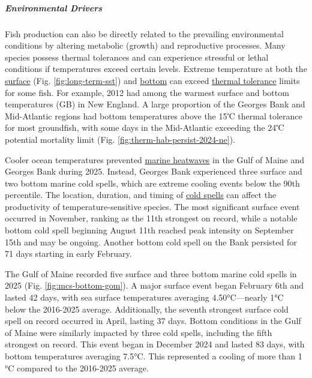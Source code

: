 \documentclass[
  10pt,
]{article}
\begin{document}
\subparagraph{Environmental Drivers}\label{environmental-drivers-1}

Fish production can also be directly related to the prevailing environmental conditions by altering metabolic (growth) and reproductive processes. Many species possess thermal tolerances and can experience stressful or lethal conditions if temperatures exceed certain levels. Extreme temperature at both the \href{https://noaa-edab.github.io/catalog/seasonal_oisst_anom.html}{surface} (Fig. \ref{fig:long-term-sst}) and \href{https://noaa-edab.github.io/catalog/bottom_temp_model_anom.html}{bottom} can exceed \href{https://noaa-edab.github.io/catalog/thermal_habitat_gridded.html}{thermal tolerance} limits for some fish. For example, 2012 had among the warmest surface and bottom temperatures (GB) in New England. A large proportion of the Georges Bank and Mid-Atlantic regions had bottom temperatures above the 15℃ thermal tolerance for most groundfish, with some days in the Mid-Atlantic exceeding the 24℃ potential mortality limit (Fig. \ref{fig:therm-hab-persist-2024-ne}).

Cooler ocean temperatures prevented \href{https://noaa-edab.github.io/catalog/heatwave.html}{marine heatwaves} in the Gulf of Maine and Georges Bank during 2025. Instead, Georges Bank experienced three surface and two bottom marine cold spells, which are extreme cooling events below the 90th percentile. The location, duration, and timing of \href{https://noaa-edab.github.io/catalog/cold_spell.html}{cold spells} can affect the productivity of temperature-sensitive species. The most significant surface event occurred in November, ranking as the 11th strongest on record, while a notable bottom cold spell beginning August 11th reached peak intensity on September 15th and may be ongoing. Another bottom cold spell on the Bank persisted for 71 days starting in early February.

The Gulf of Maine recorded five surface and three bottom marine cold spells in 2025 (Fig. \ref{fig:mcs-bottom-gom}). A major surface event began February 6th and lasted 42 days, with sea surface temperatures averaging 4.50°C---nearly 1°C below the 2016-2025 average. Additionally, the seventh strongest surface cold spell on record occurred in April, lasting 37 days. Bottom conditions in the Gulf of Maine were similarly impacted by three cold spells, including the fifth strongest on record. This event began in December 2024 and lasted 83 days, with bottom temperatures averaging 7.5°C. This represented a cooling of more than 1 °C compared to the 2016-2025 average.
\end{document}
